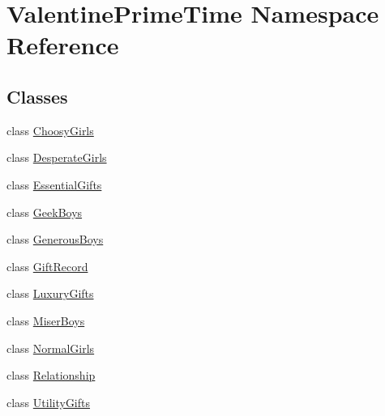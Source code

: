 \hypertarget{namespaceValentinePrimeTime}{}\section{Valentine\+Prime\+Time Namespace Reference}
\label{namespaceValentinePrimeTime}
\subsection*{Classes}
\begin{DoxyCompactItemize}
\item 
class \hyperlink{classValentinePrimeTime_1_1ChoosyGirls}{Choosy\+Girls}
\item 
class \hyperlink{classValentinePrimeTime_1_1DesperateGirls}{Desperate\+Girls}
\item 
class \hyperlink{classValentinePrimeTime_1_1EssentialGifts}{Essential\+Gifts}
\item 
class \hyperlink{classValentinePrimeTime_1_1GeekBoys}{Geek\+Boys}
\item 
class \hyperlink{classValentinePrimeTime_1_1GenerousBoys}{Generous\+Boys}
\item 
class \hyperlink{classValentinePrimeTime_1_1GiftRecord}{Gift\+Record}
\item 
class \hyperlink{classValentinePrimeTime_1_1LuxuryGifts}{Luxury\+Gifts}
\item 
class \hyperlink{classValentinePrimeTime_1_1MiserBoys}{Miser\+Boys}
\item 
class \hyperlink{classValentinePrimeTime_1_1NormalGirls}{Normal\+Girls}
\item 
class \hyperlink{classValentinePrimeTime_1_1Relationship}{Relationship}
\item 
class \hyperlink{classValentinePrimeTime_1_1UtilityGifts}{Utility\+Gifts}
\end{DoxyCompactItemize}
